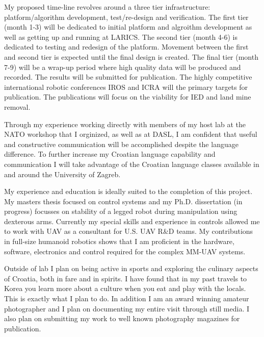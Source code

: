 \documentclass[12pt]{article}
\begin{document}
My proposed time-line revolves around a three tier infrastructure: platform/algorithm development, test/re-design and verification.  
The first tier (month 1-3) will be dedicated to initial platform and algroithm development as well as getting up and running at LARICS.  
The second tier (month 4-6) is dedicated to testing and redesign of the platform.  
Movement between the first and second tier is expected until the final design is created.
The final tier (month 7-9) will be a wrap-up period where high quality data will be produced and recorded.
The results will be submitted for publication.  
The highly competitive international robotic conferences IROS and ICRA will the primary targets for publication.  
The publications will focus on the viability for IED and land mine removal.

Through my experience working directly with members of my host lab at the NATO workshop that I orginized, as well as at DASL, I am confident that useful and constructive communication will be accomplished despite the language difference.  
To further increase my Croatian language capability and communication I will take advantage of the Croatian language classes available in and around the University of Zagreb. 

My experience and education is ideally suited to the completion of this project.  
My masters thesis focused on control systems and my Ph.D. dissertation (in progress) focusses on stability of a legged robot during manipulation using dexterous arms.  
Currently my special skills and experience in controls allowed me to work with UAV as a consultant for U.S. UAV R\&D teams.
My contributions in full-size humanoid robotics shows that I am proficient in the hardware, software, electronics and control required for the complex MM-UAV systems.


Outside of lab I plan on being active in sports and exploring the culinary aspects of Croatia, both in fare and in spirits.  
I have found that in my past travels to Korea you learn more about a culture when you eat and play with the locals.  
This is exactly what I plan to do.  
In addition I am an award winning amateur photographer and I plan on documenting my entire visit through still media.
I also plan on submitting my work to well known photography magazines for publication.
\end{document}
